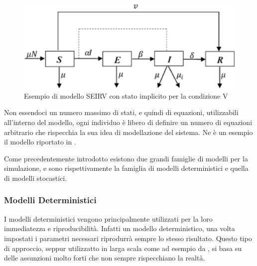 
\begin{figure}[h]
    \begin{center}
        \includegraphics[width=\linewidth]{img/seirv_implicit.jpg}
        \caption{Esempio di modello SEIRV con stato implicito per la condizione V}
        \label{fig:SEIRV_implicito}
    \end{center}
\end{figure}

Non essendoci un numero massimo di stati, e quindi di equazioni, utilizzabili
all'interno del modello, ogni individuo è libero di definire un numero
di equazioni arbitrario che rispecchia la sua idea di modellazione del 
sistema. Ne è un esempio il modello riportato in \cite{Giordano2020}.

Come precedentemente introdotto esistono due grandi famiglie di modelli
per la simulazione, e sono rispettivamente la famiglia di modelli deterministici
e quella di modelli stocastici.

\newpage

\subsubsection{Modelli Deterministici}
I modelli deterministici vengono principalmente utilizzati 
per la loro immediatezza e riproducibilità. Infatti un modello
deterministico, una volta impostati i parametri necessari
riprodurrà sempre lo stesso risultato. Questo tipo di approccio, 
seppur utilizzatto in larga scala come ad esempio da \cite{Bjornstad2020}
\cite{Mwalili2020}, \cite{Giordano2020} si basa su delle assunzioni molto forti
che non sempre rispecchiano la realtà. 


